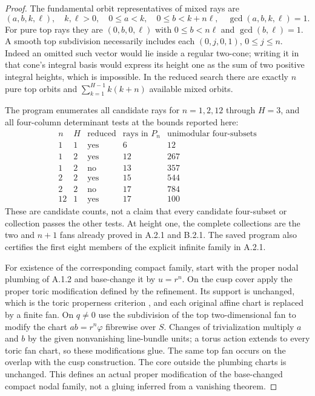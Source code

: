 \begin{proof}
The fundamental orbit representatives of mixed rays are
\[
 (a,b,k,\ell),\quad k,\ell>0,
 \quad0\leq a<k,\quad0\leq b<k+n\ell,
 \quad\gcd(a,b,k,\ell)=1.
 \tag{A.24c}
\]
For pure top rays they are $(0,b,0,\ell)$ with
$0\leq b<n\ell$ and $\gcd(b,\ell)=1$. A smooth top
subdivision necessarily includes each $(0,j,0,1)$,
$0\leq j\leq n$. Indeed an omitted such vector would lie
inside a regular two-cone; writing it in that cone's integral
basis would express its height one as the sum of two
positive integral heights, which is impossible.
In the reduced search there are exactly $n$ pure top orbits
and $\sum_{k=1}^{H-1}k(k+n)$ available mixed orbits.

The program  enumerates
all candidate rays for $n=1,2,12$ through $H=3$, and all
four-column determinant tests at the bounds reported here:
\[
\begin{array}{c|c|c|r|r}
n&H&\text{reduced}&\text{rays in }P_n&
       \text{unimodular four-subsets}\\\hline
1&1&\text{yes}&6&12\\
1&2&\text{yes}&12&267\\
1&2&\text{no}&13&357\\
2&2&\text{yes}&15&544\\
2&2&\text{no}&17&784\\
12&1&\text{yes}&17&100
\end{array}
\]
These are candidate counts, not a claim that every candidate
four-subset or collection passes the other tests. At height
one, the complete collections are the two and $n+1$ fans
already proved in A.2.1 and B.2.1. The saved program also
certifies the first eight members of the explicit infinite
family in A.2.1.

For existence of the corresponding compact family, start
with the proper nodal plumbing of A.1.2 and base-change it
by $u=r^n$. On the cusp cover apply the proper toric
modification defined by the refinement. Its support is
unchanged, which is the toric properness criterion
\cite[Section 2, p.6]{DMM16}, and each
original affine chart is replaced by a finite fan. On
$q\ne0$ use the subdivision of the top two-dimensional fan
to modify the chart $ab=r^n\varphi$ fibrewise over $S$.
Changes of trivialization multiply $a$ and $b$ by the given
nonvanishing line-bundle units; a torus action extends to
every toric fan chart, so these modifications glue. The same
top fan occurs on the overlap with the cusp construction.
The core outside the plumbing charts is unchanged. This defines
an actual proper modification of the base-changed compact
nodal family, not a gluing inferred from a vanishing theorem.


\end{proof}
